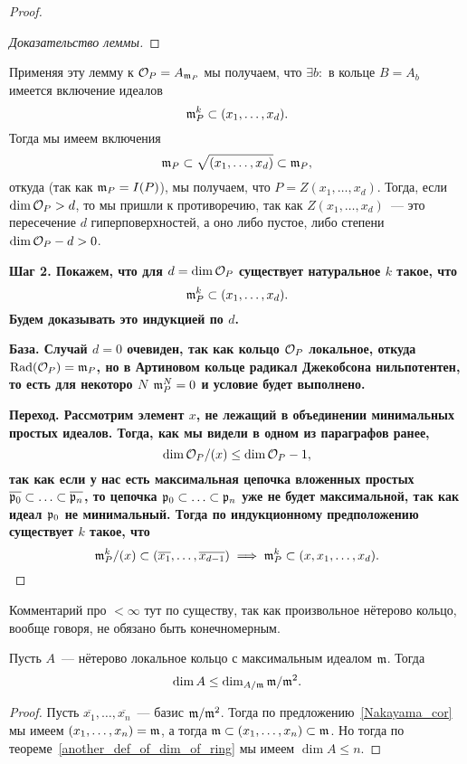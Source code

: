 \begin{proof}
\begin{proof}[Доказательство леммы]
	 			\end{proof}

	 			 Применяя эту лемму к $\mathcal{O}_P = A_{\mathfrak{m}_{P}}$ мы получаем, что $\exists b \colon $ в кольце $B = A_{b}$ имеется включение идеалов 
	 			\[
	 				\mathfrak{m}_{P}^k \subset (x_1, \ldots, x_d).
	 			\]
	 			Тогда мы имеем включения 
	 			\[
	 				\mathfrak{m}_P \subset \sqrt{(x_1, \ldots, x_d)} \subset \mathfrak{m}_{P},
	 			\]
	 			откуда (так как $\mathfrak{m}_P = I(P)$), мы получаем, что $P = Z(x_1, \ldots, x_d)$. Тогда, если $\dim{\mathcal{O}_P} > d$, то мы пришли к противоречию, так как $Z(x_1, \ldots, x_d)$~--- это пересечение $d$ гиперповерхностей, а оно  либо пустое, либо степени $\dim{\mathcal{O}_P} - d > 0$.  
	 			
	 			\noindent\bf{Шаг 2.} Покажем, что для $d = \dim{\mathcal{O}_{P}}$ существует натуральное $k$ такое, что 
	 			\[
	 				\mathfrak{m}_P^k \subset (x_1, \ldots, x_{d}).
	 			\]
	 			Будем доказывать это индукцией по $d$. 

	 			\noindent\bf{База.} Случай $d = 0$ очевиден, так как кольцо $\mathcal{O}_P$ локальное, откуда $\operatorname{Rad}(\mathcal{O}_P) = \mathfrak{m}_P$, но в Артиновом кольце радикал Джекобсона нильпотентен, то есть для некоторо $N$ $\mathfrak{m}_P^N = 0$ и условие будет выполнено. 

	 			\noindent\bf{Переход.} Рассмотрим элемент $x$, не лежащий в объединении минимальных простых идеалов. Тогда, как мы видели в одном из параграфов ранее, 
	 			\[
	 				\dim{\mathcal{O}_P/(x)} \le \dim{\mathcal{O}_P} - 1,
	 			\]
	 			так как если у нас есть максимальная цепочка вложенных простых $\overline{\mathfrak{p}_0} \subset \ldots \subset \overline{\mathfrak{p}_n}$, то цепочка $\mathfrak{p}_0 \subset \ldots \subset \mathfrak{p}_n$ уже не будет максимальной, так как идеал $\mathfrak{p}_0$ не минимальный. Тогда по индукционному предположению существует $k$ такое, что 
	 			\[
	 				\mathfrak{m}_P^k/(x) \subset (\overline{x_1}, \ldots, \overline{x_{d - 1}}) \implies  \mathfrak{m}_P^k \subset (x, x_1, \ldots, x_d).
	 			\]
	   	\end{proof}

	   	\begin{remark}
	   		Комментарий про $< \infty$ тут по существу, так как произвольное нётерово кольцо, вообще говоря, не обязано быть конечномерным. 
	   	\end{remark}

	   	\begin{corollary}
	   		Пусть $A$~--- нётерово локальное кольцо с максимальным идеалом $\mathfrak{m}$. Тогда 
	   		\[
	   			\dim{A} \le \dim_{A/\mathfrak{m}}{\mathfrak{m}/\mathfrak{m}^2}.
	   		\]
	   	\end{corollary}
	   	\begin{proof}
	   		Пусть $\overline{x_1}, \ldots, \overline{x_n}$~--- базис $\mathfrak{m}/\mathfrak{m}^2$. Тогда по предложению~\ref{Nakayama_cor} мы имеем $(x_1, \ldots, x_n) = \mathfrak{m}$, а тогда $\mathfrak{m} \subset (x_1, \ldots, x_n) \subset \mathfrak{m}$. Но тогда по теореме~\ref{another_def_of_dim_of_ring} мы имеем $\dim{A} \le n$. 
	   	\end{proof}

